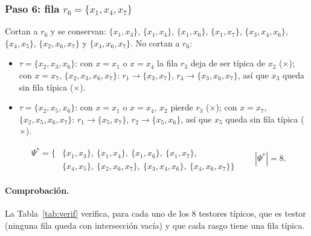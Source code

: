 \documentclass[11pt, a4paper]{article}
\theoremstyle{definition}
\theoremstyle{plain}
\newcommand{\Psis}{\Psi^{*}}
\newcommand{\x}[1]{x_{#1}}
\newcommand{\cj}[1]{\{#1\}}
\newcommand{\no}{\textcolor{red!70!black}{\ensuremath{\times}}}
\begin{document}
\subsubsection*{Paso 6: fila $r_6=\cj{\x1,\x4,\x7}$}
Cortan a $r_6$ y se conservan: $\cj{\x1,\x3}$, $\cj{\x1,\x4}$, $\cj{\x1,\x6}$,
$\cj{\x1,\x7}$, $\cj{\x3,\x4,\x6}$, $\cj{\x4,\x5}$, $\cj{\x2,\x6,\x7}$ y $\cj{\x4,\x6,\x7}$.
No cortan a $r_6$:
\begin{itemize}[nosep]
\item $\tau=\cj{\x2,\x3,\x6}$: con $x=\x1$ o $x=\x4$ la fila $r_3$ deja de ser típica de $\x2$ (\no); con $x=\x7$, $\cj{\x2,\x3,\x6,\x7}$: $r_1\to\cj{\x3,\x7}$, $r_4\to\cj{\x3,\x6,\x7}$, así que $\x3$ queda sin fila típica (\no).
\item $\tau=\cj{\x2,\x5,\x6}$: con $x=\x1$ o $x=\x4$, $\x2$ pierde $r_3$ (\no); con $x=\x7$, $\cj{\x2,\x5,\x6,\x7}$: $r_1\to\cj{\x5,\x7}$, $r_2\to\cj{\x5,\x6}$, así que $\x5$ queda sin fila típica (\no).
\end{itemize}
\[
\boxed{\begin{aligned}
\Psis=\big\{&\cj{\x1,\x3},\ \cj{\x1,\x4},\ \cj{\x1,\x6},\ \cj{\x1,\x7},\\
&\cj{\x4,\x5},\ \cj{\x2,\x6,\x7},\ \cj{\x3,\x4,\x6},\ \cj{\x4,\x6,\x7}\big\}
\end{aligned}}
\qquad |\Psis|=8.
\]

\paragraph{Comprobación.} La Tabla~\ref{tab:verif} verifica, para cada uno de los
8 testores típicos, que es testor (ninguna fila queda con intersección vacía) y
que cada rasgo tiene una fila típica.
\end{document}
